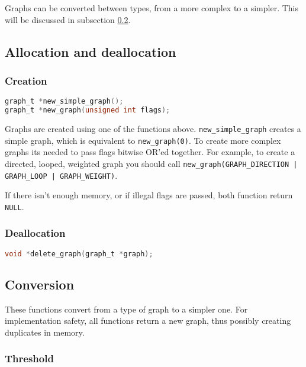 Graphs can be converted between types, from a more complex to a simpler. This will be discussed in subsection \ref{sec:graph-conversion}.

\subsection{Allocation and deallocation}
\label{sec:graph-allocation}

\subsubsection{Creation}

\begin{lstlisting}[language=C,frame=single]
graph_t *new_simple_graph();
graph_t *new_graph(unsigned int flags);
\end{lstlisting}

Graphs are created using one of the functions above. \texttt{new\_simple\_graph} creates a simple graph, which is equivalent to \texttt{new\_graph(0)}. To
create more complex graphs its needed to pass flags bitwise OR'ed together. For example, to create a directed, looped, weighted graph you should call
\texttt{new\_graph(GRAPH\_DIRECTION | GRAPH\_LOOP | GRAPH\_WEIGHT)}.

If there isn't enough memory, or if illegal flags are passed, both function return \texttt{NULL}.

\subsubsection{Deallocation}

\begin{lstlisting}[language=C,frame=single]
void *delete_graph(graph_t *graph);
\end{lstlisting}

\subsection{Conversion}
\label{sec:graph-conversion}

These functions convert from a type of graph to a simpler one. For implementation safety, all functions return a new graph, thus possibly creating duplicates in memory.

\subsubsection{Threshold}

